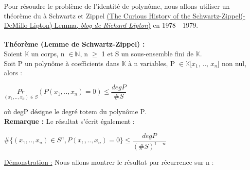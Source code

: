 \documentclass[12pt,a4paper]{article}
\begin{document}
Pour résoudre le problème de l'identité de polynôme, nous allons utiliser un théorème du à Schwartz et Zippel \href{https://rjlipton.wordpress.com/2009/11/30/the-curious-history-of-the-schwartz-zippel-lemma/}{(The Curious History of the Schwartz-Zippel(-DeMillo-Lipton) Lemma, \textit{blog de Richard Lipton})} en 1978 - 1979.\\\\
\textbf{\large Théorème (Lemme de Schwartz-Zippel) :}\\
Soient $\mathbb{K}$ un corps, n $\in \mathbb{N}$, n $\geq$ 1 et S un sous-ensemble fini de $\mathbb{K}$.\\
Soit P un polynôme à coefficients dans $\mathbb{K}$ à n variables, P $\in \mathbb{K}$[$x_1$, .., $x_n$] non nul, alors :
\begin{center}
	$\underset{(x_1, .., x_n)\in S}{Pr} (P(x_1, .., x_n) = 0) \leq \dfrac{degP}{\#S}$
\end{center}
où degP désigne le degré totem du polynôme P.\\
\textbf{Remarque :} Le résultat s'écrit également :
\begin{center}
	$\#\{(x_1, .., x_n) \in S^n, P(x_1, .., x_n) = 0\} \leq \dfrac{degP}{(\#S)^{1 - n}}$
\end{center}
\underline{Démonstration :} Nous allons montrer le résultat par récurrence sur n :
\end{document}
